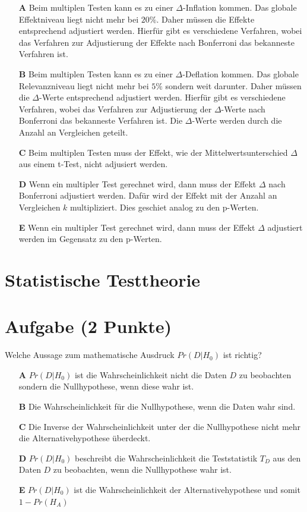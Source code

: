 \documentclass[a4paper, 9pt]{scrartcl}\usepackage[]{graphicx}\usepackage[]{xcolor}
\begin{document}
\begin{enumerate}
\item [\textbf{A} \msquare] Beim multiplen Testen kann es zu einer $\Delta$-Inflation kommen. Das globale Effektniveau liegt nicht mehr bei $20\%$. Daher müssen die Effekte entsprechend adjustiert werden. Hierfür gibt es verschiedene Verfahren, wobei das Verfahren zur Adjustierung der Effekte nach Bonferroni das bekanneste Verfahren ist.
\item [\textbf{B} \msquare] Beim multiplen Testen kann es zu einer $\Delta$-Deflation kommen. Das globale Relevanzniveau liegt nicht mehr bei $5\%$ sondern weit darunter. Daher müssen die $\Delta$-Werte entsprechend adjustiert werden. Hierfür gibt es verschiedene Verfahren, wobei das Verfahren zur Adjustierung der $\Delta$-Werte nach Bonferroni das bekanneste Verfahren ist. Die $\Delta$-Werte werden durch die Anzahl an Vergleichen geteilt.
\item [\textbf{C} \msquare] Beim multiplen Testen muss der Effekt, wie der Mittelwertsunterschied $\Delta$ aus einem t-Test, nicht adjusiert werden.
\item [\textbf{D} \msquare] Wenn ein multipler Test gerechnet wird, dann muss der Effekt $\Delta$ nach Bonferroni adjustiert werden. Dafür wird der Effekt mit der Anzahl an Vergleichen $k$ multipliziert. Dies geschiet analog zu den p-Werten.
\item [\textbf{E} \msquare] Wenn ein multipler Test gerechnet wird, dann muss der Effekt $\Delta$ adjustiert werden im Gegensatz zu den p-Werten.
\end{enumerate}
\section*{Statistische Testtheorie}  

\section{Aufgabe \hfill (2 Punkte)}




Welche Aussage zum mathematische Ausdruck $Pr(D|H_0)$ ist richtig?



\begin{enumerate}
\item [\textbf{A} \msquare] $Pr(D|H_0)$ ist die Wahrscheinlichkeit nicht die Daten $D$ zu beobachten sondern die Nullhypothese, wenn diese wahr ist.
\item [\textbf{B} \msquare] Die Wahrscheinlichkeit für die Nullhypothese, wenn die Daten wahr sind.
\item [\textbf{C} \msquare] Die Inverse der Wahrscheinlichkeit unter der die Nullhypothese nicht mehr die Alternativehypothese überdeckt.
\item [\textbf{D} \msquare] $Pr(D|H_0)$ beschreibt die Wahrscheinlichkeit die Teststatistik $T_D$ aus den Daten $D$ zu beobachten, wenn die Nullhypothese wahr ist.
\item [\textbf{E} \msquare] $Pr(D|H_0)$ ist die Wahrscheinlichkeit der Alternativehypothese und somit $1 - Pr(H_A)$
\end{enumerate}
\end{document}
